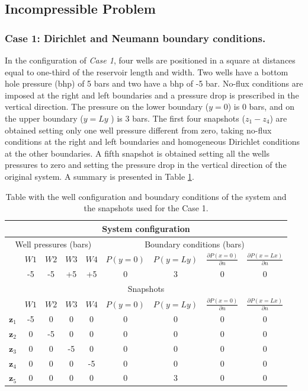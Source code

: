 \documentclass[12pt]{article}
\begin{document}
\subsection{Incompressible Problem}
\subsubsection*{Case 1: Dirichlet and Neumann boundary conditions.}
In the configuration of \emph{Case 1}, four wells are positioned in a square at distances equal 
to one-third of the reservoir length and width. Two wells have a bottom hole pressure (bhp) of 5 bars and two have 
a bhp of -5 bar. No-flux conditions are imposed at the right and left boundaries and a pressure drop
is prescribed in the vertical direction. The pressure on the lower boundary ($y=0$) is 0 bars, and on
the upper boundary ($y=Ly$ ) is 3 bars. 
The first four snapshots ($z_1-z_4$) are obtained setting only one well pressure
different from zero, taking no-flux conditions at the right and left boundaries and 
homogeneous Dirichlet conditions at the other boundaries. A fifth snapshot is obtained 
setting all the wells pressures to zero and setting the pressure drop in the vertical 
direction of the original system. 
A summary is presented in Table \ref{table:c1}.
\renewcommand{\arraystretch}{1.5}
\begin{table}[!ht]\centering
\begin{minipage}{.8\textwidth}
\vspace{-10pt}
\centering
\begin{tabular}{ |c|c|c|c|c|c|c|c|c|} 
 \hline
  \multicolumn{9}{|c|}{System configuration} \\ 
  \hline
  \multicolumn{5}{|c|}{Well pressures (bars)}&\multicolumn{4}{c|}{Boundary conditions (bars)}\\
  \hline
  &$W1$ &$W2$ &$W3$ &$W4$ &$P(y=0)$ & $P(y=Ly)$&$\frac{\partial P(x=0)}{\partial n}$ & $\frac{\partial P(x=Lx)}{\partial n}$\\
  \hline
& -5& -5& +5& +5& 0& 3&0 &0 \\
\hline
\multicolumn{9}{|c|}{Snapshots} \\
\hline
  &$W1$ &$W2$ &$W3$ &$W4$ &$P(y=0)$ & $P(y=Ly)$&$\frac{\partial P(x=0)}{\partial n}$ & $\frac{\partial P(x=Lx)}{\partial n}$\\
  \hline
$\mathbf{z}_1$& -5&0 &0 &0 &0 &0 &0 &0 \\
$\mathbf{z}_2$& 0& -5& 0& 0& 0& 0& 0& 0\\
$\mathbf{z}_3$& 0& 0& -5& 0& 0& 0& 0& 0\\
$\mathbf{z}_4$& 0& 0& 0& -5&0 & 0& 0&0 \\
$\mathbf{z}_5$& 0& 0& 0& 0& 0& 3& 0&0 \\
 \hline
\end{tabular}
\caption{Table with the well configuration and boundary conditions of the system and the snapshots used for the Case 1.}
\label{table:c1}
\end{minipage}
\end{table}
\end{document}
